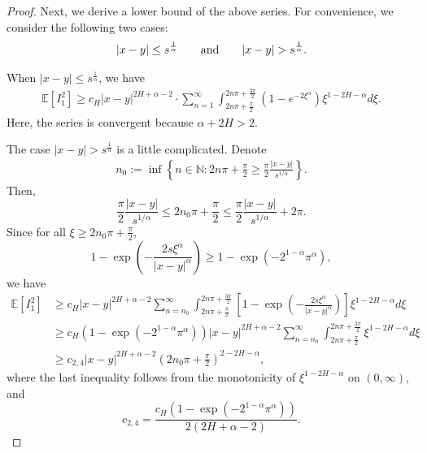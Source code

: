 \documentclass[11pt,reqno]{amsart}
\numberwithin{equation}{section}
\def\EE{\mathbb{E}}
\newcommand{\1}{{\bf 1}}
\newcommand{\2}{{\bf 2}}
\newcommand{\lc}{\left(}
\newcommand{\rc}{\right)}
\begin{document}
\begin{proof}
    Next, we derive a lower bound of  the above series.   For  convenience, we consider the following two cases:
 $$
     |x-y|\le s^{\frac{1}{\alpha}}\qquad{\rm and}\qquad |x-y|> s^{\frac{1}{\alpha}}.
 $$

    When $|x-y|\leq s^{\frac{1}{\alpha}}$, we have
	\begin{align}
  \EE\left[I_1^2\right] \geq   c_{H}|x-y|^{2H+\alpha-2}  \cdot   \sum_{n=1}^{\infty} \int_{2n\pi+\frac{\pi}{2}}^{2n\pi+\frac{3\pi}{2}}\lc 1-e^{-2\xi^{\alpha}} \rc  \xi^{1-2H-\alpha} d\xi. \label{I-2}
	\end{align}
Here, the series is convergent because  $\alpha+2H>2$.

The case  $|x-y|>s^{\frac{1}{\alpha}}$ is a little complicated. Denote
\begin{align}\label{eq n0}
	 n_0:=\inf\left\{n\in \mathbb N:2n\pi+\frac{\pi}{2}\geq\frac{\pi}{2} \frac{|x-y|}{s^{1/\alpha}} \right\}.
\end{align}
Then,
\begin{equation}\label{n_0}
\frac{\pi}{2} \frac{|x-y|}{s^{1/\alpha}}\leq
2n_0\pi+\frac{\pi}{2}\leq\frac{\pi}{2} \frac{|x-y|}{s^{1/\alpha}}+2\pi.
\end{equation}
 Since   for all  $\xi \geq 2n_0\pi + \frac{\pi}{2}$,
\[
1 - \exp\left(-\frac{2s\xi^{\alpha}}{|x-y|^{\alpha}}\right) \geq 1 - \exp(-2^{1-\alpha}\pi^{\alpha}), 
\]
 we have
\begin{equation}\label{eq:mathcalI2}
\begin{split}
\EE\left[I_1^2\right] &\geq c_{H}|x-y|^{2H+\alpha-2} \sum_{n=n_0}^{\infty} \int_{2n\pi+\frac{\pi}{2}}^{2n\pi+\frac{3\pi}{2}}
\left[1 - \exp\left(-\frac{2s\xi^{\alpha}}{|x-y|^{\alpha}}\right)\right] \xi^{1-2H-\alpha} d\xi \\
&\geq c_{H} \left(1 - \exp(-2^{1-\alpha}\pi^{\alpha})\right) |x-y|^{2H+\alpha-2}
\sum_{n=n_0}^\infty \int_{2n\pi+\frac{\pi}{2}}^{2n\pi+\frac{3\pi}{2}} \xi^{1-2H-\alpha} d\xi \\
&\geq c_{2,4} |x-y|^{2H+\alpha-2} \left(2n_0\pi+\frac{\pi}{2}\right)^{2-2H-\alpha},
\end{split}	
\end{equation}
where   the last inequality follows from the monotonicity of $\xi^{1-2H-\alpha}$ on $(0, \infty)$, and 
$$c_{2,4} = \frac{c_{H}(1 - \exp(-2^{1-\alpha}\pi^{\alpha}))}{2(2H+\alpha-2)}.$$


\end{proof}
\end{document}
